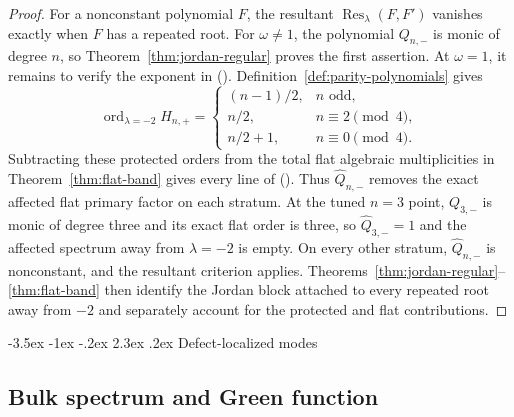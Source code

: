 \documentclass[twoside,10pt]{article}
\makeatletter
\numberwithin{equation}{section}
\theoremstyle{slbody}
\theoremstyle{definition}
\theoremstyle{remark}
\newcommand{\Res}{\operatorname*{Res}}
\renewcommand{\section}{%
  \@startsection{section}{1}{\z@}%
    {-3.5ex \@plus -1ex \@minus -.2ex}%
    {2.3ex \@plus .2ex}%
    {\normalfont\large\bfseries}}
\renewcommand{\eqref}[1]{%
  \textup{{\normalfont(\oldstylenums{\ref{#1}}}\normalfont)}}
\makeatother
\begin{document}
\begin{proof}
For a nonconstant polynomial $F$, the resultant
$\Res_\lambda(F,F')$ vanishes exactly when $F$ has a repeated root.
For $\omega\ne1$, the polynomial $Q_{n,-}$ is monic of degree $n$, so
Theorem~\ref{thm:jordan-regular} proves the first assertion.  At
$\omega=1$, it remains to verify the exponent in
\eqref{eq:flat-affected-order}.  Definition~\ref{def:parity-polynomials}
gives
\[
 \operatorname{ord}_{\lambda=-2}H_{n,+}=\begin{cases}
  (n-1)/2,&n\text{ odd},\\
  n/2,&n\equiv2\pmod4,\\
  n/2+1,&n\equiv0\pmod4.
 \end{cases}
\]
Subtracting these protected orders from the total flat algebraic
multiplicities in Theorem~\ref{thm:flat-band} gives every line of
\eqref{eq:flat-affected-order}.  Thus $\widehat Q_{n,-}$ removes the
exact affected flat primary factor on each stratum.  At the tuned
$n=3$ point, $Q_{3,-}$ is monic of degree three and its exact flat order
is three, so $\widehat Q_{3,-}=1$ and the affected spectrum away from
$\lambda=-2$ is empty.  On every other stratum, $\widehat Q_{n,-}$ is
nonconstant, and the resultant criterion applies.
Theorems~\ref{thm:jordan-regular}--\ref{thm:flat-band} then identify the
Jordan block attached to every repeated root away from $-2$ and separately
account for the protected and flat contributions.
\end{proof}

\section{Defect-localized modes}\label{sec:localization}

\subsection{Bulk spectrum and Green function}
\end{document}
